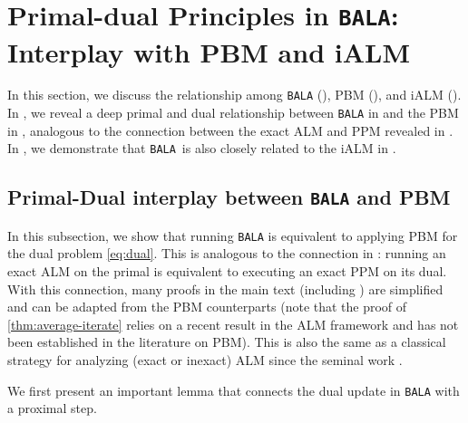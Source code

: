 \documentclass[11pt]{article}
\newcommand{\alg}{\texttt{BALA}}%
\begin{document}
\section{Primal-dual Principles in \alg: Interplay with PBM and iALM}
\label{section:AALA-PBM}
In this section, we discuss the relationship among \alg{} (), PBM (), and iALM (). In , we reveal 
 a deep primal and dual relationship between \alg{} in  and the PBM in , analogous to the connection between the exact ALM and PPM revealed in \cite{rockafellar1976augmented}. In , we demonstrate that \alg~is also closely related to the iALM in . 

\subsection{Primal-Dual interplay between \alg{} and PBM}
\label{subsection:AALA-PBM}
In this subsection, we show that running \alg{} is equivalent to applying PBM for the dual problem \eqref{eq:dual}. This is analogous to the connection in \cite{rockafellar1976augmented}: running an exact ALM on the primal is equivalent to executing an exact PPM on its dual. With this connection, many proofs in the main text (including ) are simplified and can be adapted from the PBM counterparts (note that the proof of \cref{thm:average-iterate} relies on a recent result in the ALM framework \cite{xu2021iteration} and has not been established in the literature on PBM). This is also the same as a classical strategy for analyzing (exact or inexact) ALM since the seminal work \cite{rockafellar1976augmented}. 


We first present an important lemma that connects the dual update in \alg{} with a proximal step. 
\end{document}
